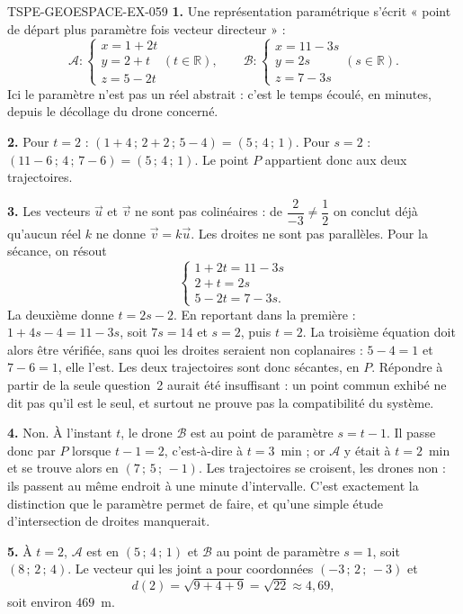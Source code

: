 \begin{corrige}{TSPE-GEOESPACE-EX-059}
\textbf{1.} Une représentation paramétrique s'écrit « point de départ plus
paramètre fois vecteur directeur » :
\[
  \mathcal{A}:\begin{cases}x=1+2t\\ y=2+t\\ z=5-2t\end{cases}(t\in\mathbb{R}),
  \qquad
  \mathcal{B}:\begin{cases}x=11-3s\\ y=2s\\ z=7-3s\end{cases}(s\in\mathbb{R}).
\]
Ici le paramètre n'est pas un réel abstrait : c'est le temps écoulé, en minutes,
depuis le décollage du drone concerné.

\textbf{2.} Pour $t=2$ : $(1+4\,;\,2+2\,;\,5-4)=(5\,;\,4\,;\,1)$. Pour $s=2$ :
$(11-6\,;\,4\,;\,7-6)=(5\,;\,4\,;\,1)$. Le point $P$ appartient donc aux deux
trajectoires.

\textbf{3.} Les vecteurs $\vec u$ et $\vec v$ ne sont pas colinéaires : de
$\dfrac{2}{-3}\neq\dfrac{1}{2}$ on conclut déjà qu'aucun réel $k$ ne donne
$\vec v=k\vec u$. Les droites ne sont pas parallèles. Pour la sécance, on résout
\[
  \begin{cases}1+2t=11-3s\\ 2+t=2s\\ 5-2t=7-3s.\end{cases}
\]
La deuxième donne $t=2s-2$. En reportant dans la première :
$1+4s-4=11-3s$, soit $7s=14$ et $s=2$, puis $t=2$. La troisième équation doit
alors être vérifiée, sans quoi les droites seraient non coplanaires : $5-4=1$ et
$7-6=1$, elle l'est. Les deux trajectoires sont donc sécantes, en $P$. Répondre à
partir de la seule question~2 aurait été insuffisant : un point commun exhibé ne
dit pas qu'il est le seul, et surtout ne prouve pas la compatibilité du système.

\textbf{4.} Non. À l'instant $t$, le drone $\mathcal{B}$ est au point de
paramètre $s=t-1$. Il passe donc par $P$ lorsque $t-1=2$, c'est-à-dire à
$t=3$~min ; or $\mathcal{A}$ y était à $t=2$~min et se trouve alors en
$(7\,;\,5\,;\,-1)$. Les trajectoires se croisent, les drones non : ils passent au
même endroit à une minute d'intervalle. C'est exactement la distinction que le
paramètre permet de faire, et qu'une simple étude d'intersection de droites
manquerait.

\textbf{5.} À $t=2$, $\mathcal{A}$ est en $(5\,;\,4\,;\,1)$ et $\mathcal{B}$ au
point de paramètre $s=1$, soit $(8\,;\,2\,;\,4)$. Le vecteur qui les joint a pour
coordonnées $(-3\,;\,2\,;\,-3)$ et
\[
  d(2)=\sqrt{9+4+9}=\sqrt{22}\approx 4{,}69,
\]
soit environ $469$~m.


\end{corrige}
